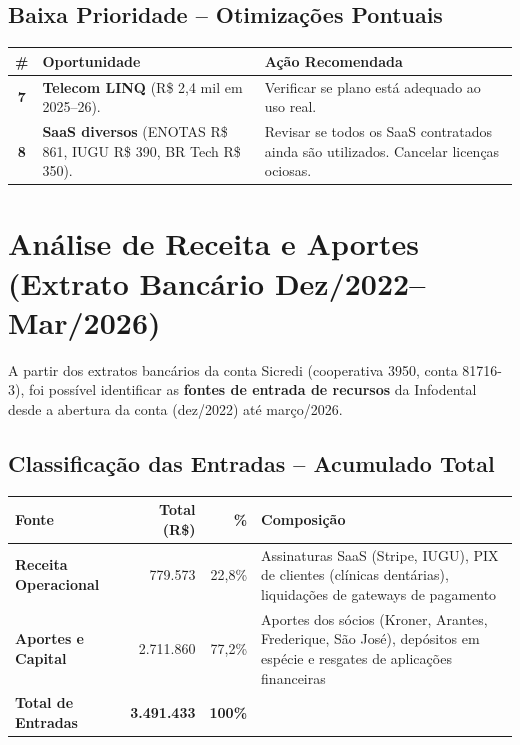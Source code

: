 \documentclass[12pt, a4paper]{article}
\begin{document}
\subsection{Baixa Prioridade -- Otimizações Pontuais}

\begin{table}[H]
    \centering
    \renewcommand{\arraystretch}{1.5}
    \begin{tabularx}{\textwidth}{c X X}
        \toprule
        \rowcolor{lightGray} \textbf{\#} & \textbf{Oportunidade} & \textbf{Ação Recomendada} \\
        \midrule
        \textbf{7} & \textbf{Telecom LINQ} (R\$ 2,4 mil em 2025--26). & Verificar se plano está adequado ao uso real. \\
        \midrule
        \textbf{8} & \textbf{SaaS diversos} (ENOTAS R\$ 861, IUGU R\$ 390, BR Tech R\$ 350). & Revisar se todos os SaaS contratados ainda são utilizados. Cancelar licenças ociosas. \\
        \bottomrule
    \end{tabularx}
\end{table}

\newpage
\section{Análise de Receita e Aportes (Extrato Bancário Dez/2022--Mar/2026)}

A partir dos extratos bancários da conta Sicredi (cooperativa 3950, conta 81716-3), foi possível identificar as \textbf{fontes de entrada de recursos} da Infodental desde a abertura da conta (dez/2022) até março/2026.

\subsection{Classificação das Entradas -- Acumulado Total}

\begin{table}[H]
    \centering
    \renewcommand{\arraystretch}{1.4}
    \begin{tabularx}{\textwidth}{l r r X}
        \toprule
        \rowcolor{tableHeader} \textbf{Fonte} & \textbf{Total (R\$)} & \textbf{\%} & \textbf{Composição} \\
        \midrule
        \textbf{Receita Operacional} & 779.573 & 22,8\% & Assinaturas SaaS (Stripe, IUGU), PIX de clientes (clínicas dentárias), liquidações de gateways de pagamento \\
        \textbf{Aportes e Capital} & 2.711.860 & 77,2\% & Aportes dos sócios (Kroner, Arantes, Frederique, São José), depósitos em espécie e resgates de aplicações financeiras \\
        \midrule
        \rowcolor{lightGray} \textbf{Total de Entradas} & \textbf{3.491.433} & \textbf{100\%} & \\
        \bottomrule
    \end{tabularx}
\end{table}
\end{document}
